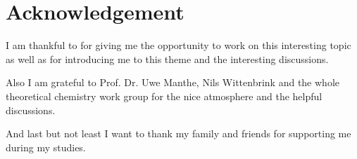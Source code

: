 \section*{Acknowledgement}

I am thankful to \workPruefer for giving me the opportunity to work on this interesting topic as well as for introducing me to this theme and the interesting discussions.


Also I am grateful to Prof. Dr. Uwe Manthe, Nils Wittenbrink and the whole theoretical chemistry work group for the nice atmosphere and the helpful discussions.


And last but not least I want to thank my family and friends for supporting me during my studies.
